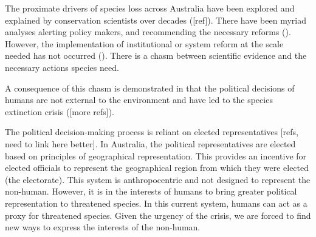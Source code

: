\documentclass[a4paper,11pt]{article}
\begin{document}
The proximate drivers of species loss across Australia have been explored and explained by conservation scientists over decades (\cite{rydenLinkingDemocracyBiodiversity2020}[ref]). There have been myriad analyses alerting policy makers, and recommending the necessary reforms (\cite{hawkeReportIndependentReview2009,samuelIndependentReviewEPBC2020,mcdonaldImprovingPolicyEfficiency2015}). However, the implementation of institutional or system reform at the scale needed has not occurred (\cite{woinarskiContributionPolicyLaw2017,resideHowSendFinch2019}). There is a chasm between scientific evidence and the necessary actions species need.

A consequence of this chasm is demonstrated in that the political decisions of humans are not external to the environment and have led to the species extinction crisis (\cite{dalbyAnthropoceneFormationsEnvironmental2017a,burkeSpeciesBordersPolitical2020}[more refs]).

The political decision-making process is reliant on elected representatives [refs, need to link here better]. In Australia, the political representatives are elected based on principles of geographical representation. This provides an incentive for elected officials to represent the geographical region from which they were elected (the electorate). This system is anthropocentric and not designed to represent the non-human. However, it is in the interests of humans to bring greater political representation to threatened species. In this current system, humans can act as a proxy for threatened species. Given the urgency of the crisis, we are forced to find new ways to express the interests of the non-human.

\end{document}
